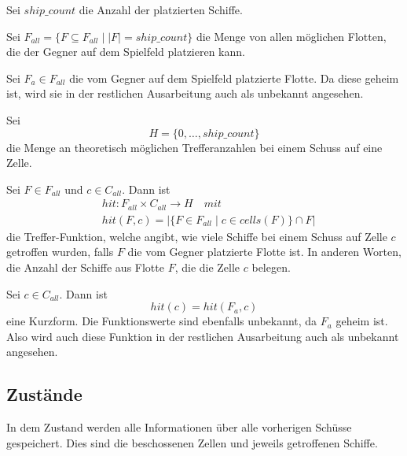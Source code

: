 \documentclass[a4paper,12pt]{llncs}
\numberwithin{equation}{section}
\begin{document}
\begin{definition}
Sei $ship\_count$ die Anzahl der platzierten Schiffe.
\end{definition}

\begin{definition}
Sei $F_{all}=\{F \subseteq F_{all} \mid |F|=ship\_count\}$ die Menge von allen möglichen Flotten, die der Gegner auf dem Spielfeld platzieren kann.
\end{definition}

\begin{definition}
Sei $F_a \in F_{all}$ die vom Gegner auf dem Spielfeld platzierte Flotte.
Da diese geheim ist, wird sie in der restlichen Ausarbeitung auch als unbekannt angesehen.
\end{definition}

\begin{definition}
Sei
\[
H=\{0, \dots, ship\_count\}
\]
die Menge an theoretisch möglichen Trefferanzahlen bei einem Schuss auf eine Zelle.
\end{definition}

\begin{definition}
Sei $F \in F_{all}$ und $c \in C_{all}$.
Dann ist 
\begin{align}
&hit:F_{all} \times C_{all} \rightarrow H \quad mit \nonumber\\
&hit(F, c)=|\{F \in F_{all} \mid c \in cells(F)\} \cap F|  \nonumber
\end{align}
die Treffer-Funktion, welche angibt, wie viele Schiffe bei einem Schuss auf Zelle $c$ getroffen wurden, falls $F$ die vom Gegner platzierte Flotte ist. In anderen Worten, die Anzahl der Schiffe aus Flotte $F$, die die Zelle $c$ belegen.
\end{definition}

\begin{definition}
Sei $c \in C_{all}$.
Dann ist 
\[
hit(c)=hit(F_a, c)
\]
eine Kurzform. Die Funktionswerte sind ebenfalls unbekannt, da $F_a$ geheim ist. Also wird auch diese Funktion in der restlichen Ausarbeitung auch als unbekannt angesehen.
\end{definition}

\subsection{Zustände}

In dem Zustand werden alle Informationen über alle vorherigen Schüsse gespeichert.
Dies sind die beschossenen Zellen und jeweils getroffenen Schiffe.
\end{document}
